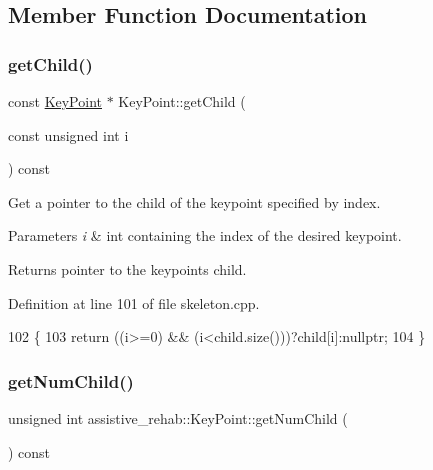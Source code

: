 \subsection{Member Function Documentation}
\mbox{\label{classassistive__rehab_1_1KeyPoint_a87aced4b21c5d5a8f67c7e1cb3936282}} 
\subsubsection{\texorpdfstring{get\+Child()}{getChild()}}
{\footnotesize\ttfamily const \hyperlink{classassistive__rehab_1_1KeyPoint}{Key\+Point} $\ast$ Key\+Point\+::get\+Child (\begin{DoxyParamCaption}\item[{const unsigned int}]{i }\end{DoxyParamCaption}) const}



Get a pointer to the child of the keypoint specified by index. 


\begin{DoxyParams}{Parameters}
{\em i} & int containing the index of the desired keypoint. \\
\hline
\end{DoxyParams}
\begin{DoxyReturn}{Returns}
pointer to the keypoint\textquotesingle{}s child. 
\end{DoxyReturn}


Definition at line 101 of file skeleton.\+cpp.


\begin{DoxyCode}
102 \{
103     \textcolor{keywordflow}{return} ((i>=0) && (i<child.size()))?child[i]:\textcolor{keyword}{nullptr};
104 \}
\end{DoxyCode}
\mbox{\label{classassistive__rehab_1_1KeyPoint_aeb002852df51f7eaa5b719dc9b019863}} 
\subsubsection{\texorpdfstring{get\+Num\+Child()}{getNumChild()}}
{\footnotesize\ttfamily unsigned int assistive\+\_\+rehab\+::\+Key\+Point\+::get\+Num\+Child (\begin{DoxyParamCaption}{ }\end{DoxyParamCaption}) const\hspace{0.3cm}{\ttfamily [inline]}}




